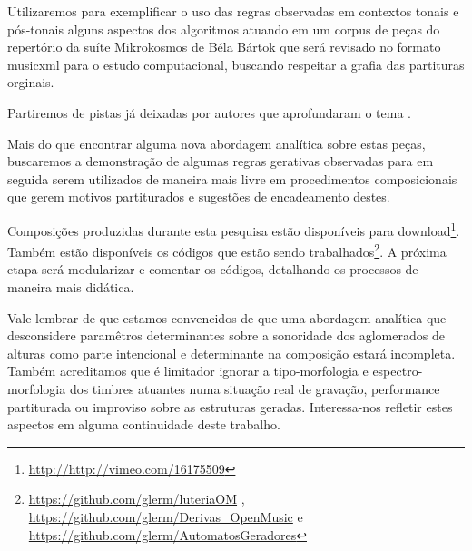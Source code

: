 \documentclass[
	12pt,				%
	openright,			%
	twoside,			%
	a4paper,			%
	english,			%
	french,				%
	spanish,			%
	brazil				%
	]{abntex2}
\begin{document}
Utilizaremos para exemplificar o uso das regras observadas em contextos tonais e pós-tonais alguns aspectos dos algoritmos atuando em um corpus de peças do repertório da suíte Mikrokosmos de Béla Bártok que será revisado no formato musicxml para o estudo computacional, buscando respeitar a grafia das partituras orginais. 

Partiremos de pistas já deixadas por autores que aprofundaram o tema \cite{marshall1946analysis,suchoff1971guide, lendvai1971bela,antokoletz1984music,suchoff2004bartok,lester1989analytic}.

Mais do que encontrar alguma nova abordagem analítica sobre estas peças, buscaremos a demonstração de algumas regras gerativas observadas para em seguida serem utilizados de maneira mais livre em procedimentos composicionais que gerem motivos partiturados e sugestões de encadeamento destes.

Composições produzidas durante esta pesquisa estão disponíveis para download\footnote{\url{http://http://vimeo.com/16175509}}. Também estão disponíveis os códigos que estão sendo trabalhados\footnote{\url{https://github.com/glerm/luteriaOM} , \url{https://github.com/glerm/Derivas_OpenMusic} e \url{https://github.com/glerm/AutomatosGeradores} }. A próxima etapa será modularizar e comentar os códigos, detalhando os processos de maneira mais didática.

Vale lembrar de que estamos convencidos de que uma abordagem analítica que desconsidere paramêtros determinantes sobre a sonoridade\cite{guigue2012} dos aglomerados de alturas como parte intencional e determinante na composição estará incompleta. Também acreditamos que é limitador ignorar a tipo-morfologia\cite{shaeffer1966traite} e espectro-morfologia\cite{smalley1997spectromorphology} dos timbres atuantes numa situação real de gravação, performance partiturada ou improviso sobre as estruturas geradas. Interessa-nos refletir estes aspectos em alguma continuidade deste trabalho.




\postextual

%

%
%
\end{document}
